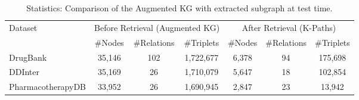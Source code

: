 \begin{table*}[h]
    \centering
     \footnotesize
    \begin{adjustbox}{max width=0.7\textwidth}
    \begin{tabular}{lcccccc}
        \toprule
        \multirow{2}{*}{Dataset} & \multicolumn{3}{c}{Before Retrieval (Augmented KG)} & \multicolumn{3}{c}{After Retrieval (K-Paths)} \\
        \cmidrule(lr){2-4} \cmidrule(lr){5-7}
         & \#Nodes & \#Relations & \#Triplets & \#Nodes & \#Relations & \#Triplets \\
        \midrule
        DrugBank & 35,146 & 102 & 1,722,677 & 6,378 & 94 & 175,698 \\
        DDInter  & 35,169 & 26 & 1,710,079 & 5,647 & 18 & 102,854  \\
        PharmacotherapyDB & 33,952 & 26 & 1,690,945 & 2,847 & 23 & 13,942 \\
        \bottomrule
    \end{tabular}
    \end{adjustbox}
    \caption{Statistics: Comparison of the Augmented KG with extracted subgraph at test time.}
    \label{tab:path_retrieval}
\end{table*}

